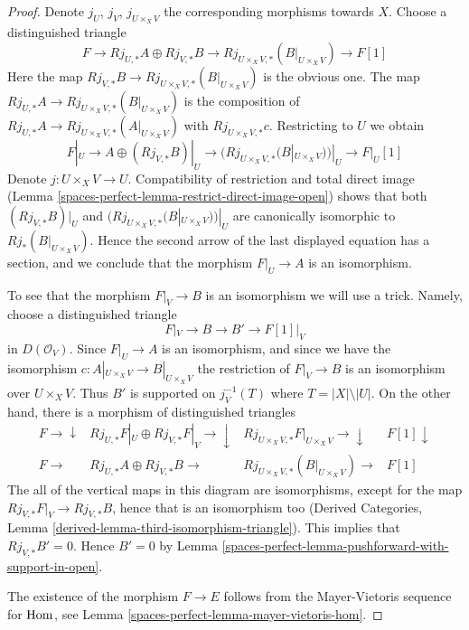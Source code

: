 \begin{proof}
Denote $j_U$, $j_V$, $j_{U \times_X V}$ the corresponding morphisms towards
$X$. Choose a distinguished triangle
$$
F \to Rj_{U, *}A \oplus Rj_{V, *}B \to
Rj_{U \times_X V, *}(B|_{U \times_X V}) \to F[1]
$$
Here the map $Rj_{V, *}B \to Rj_{U \times_X V, *}(B|_{U \times_X V})$
is the obvious one. The map
$Rj_{U, *}A \to Rj_{U \times_X V, *}(B|_{U \times_X V})$
is the composition of
$Rj_{U, *}A \to Rj_{U \times_X V, *}(A|_{U \times_X V})$
with $Rj_{U \times_X V, *}c$. Restricting to $U$ we obtain
$$
F|_U \to A \oplus (Rj_{V, *}B)|_U \to
(Rj_{U \times_X V, *}(B|_{U \times_X V}))|_U \to F|_U[1]
$$
Denote $j : U \times_X V \to U$. Compatibility of restriction and
total direct image (Lemma \ref{spaces-perfect-lemma-restrict-direct-image-open})
shows that both $(Rj_{V, *}B)|_U$ and
$(Rj_{U \times_X V, *}(B|_{U \times_X V}))|_U$
are canonically isomorphic to $Rj_*(B|_{U \times_X V})$.
Hence the second arrow of the last displayed equation has
a section, and we conclude that the morphism $F|_U \to A$ is
an isomorphism.

\medskip\noindent
To see that the morphism $F|_V \to B$ is an isomorphism we will use a trick.
Namely, choose a distinguished triangle
$$
F|_V \to B \to B' \to F[1]|_V
$$
in $D(\mathcal{O}_V)$. Since $F|_U \to A$ is an isomorphism, and since
we have the isomorphism $c : A|_{U \times_X V} \to B|_{U \times_X V}$
the restriction of $F|_V \to B$ is an isomorphism over $U \times_X V$.
Thus $B'$ is supported on $j_V^{-1}(T)$ where $T = |X| \setminus |U|$.
On the other hand, there is a morphism of distinguished triangles
$$
\begin{array}{cccc}F \longrightarrow\downarrow & Rj_{U, *}F|_U \oplus Rj_{V, *}F|_V \longrightarrow\downarrow & Rj_{U \times_X V, *}F|_{U \times_X V} \longrightarrow\downarrow & F[1] \downarrow \\ F \longrightarrow & Rj_{U, *}A \oplus Rj_{V, *}B \longrightarrow & Rj_{U \times_X V, *}(B|_{U \times_X V}) \longrightarrow & F[1]\end{array}
$$
The all of the vertical maps in this diagram are isomorphisms, except
for the map $Rj_{V, *}F|_V \to Rj_{V, *}B$, hence that is an isomorphism too
(Derived Categories, Lemma \ref{derived-lemma-third-isomorphism-triangle}).
This implies that $Rj_{V, *}B' = 0$. Hence $B' = 0$ by
Lemma \ref{spaces-perfect-lemma-pushforward-with-support-in-open}.

\medskip\noindent
The existence of the morphism $F \to E$ follows
from the Mayer-Vietoris sequence for $\operatorname{Hom}$, see
Lemma \ref{spaces-perfect-lemma-mayer-vietoris-hom}.
\end{proof}

